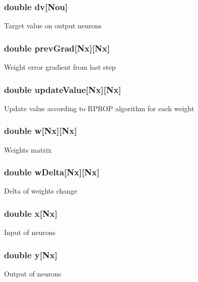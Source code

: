 \subsubsection[{dv}]{\setlength{\rightskip}{0pt plus 5cm}double dv[Nou]}\label{a00001_a3cd26d516c0d78e0bd8e83f7b5d96056}
Target value on output neurons 
\subsubsection[{prev\+Grad}]{\setlength{\rightskip}{0pt plus 5cm}double prev\+Grad[Nx][Nx]}\label{a00001_ae668825bd99ec5a8e701cd34833d92c8}
Weight error gradient from last step 
\subsubsection[{update\+Value}]{\setlength{\rightskip}{0pt plus 5cm}double update\+Value[Nx][Nx]}\label{a00001_a56f1cf095bad5da7e0c944dd9727293a}
Update value according to R\+P\+R\+O\+P algorithm for each weight 
\subsubsection[{w}]{\setlength{\rightskip}{0pt plus 5cm}double w[Nx][Nx]}\label{a00001_aee905c93142ba709a90118c788622185}
Weights matrix 
\subsubsection[{w\+Delta}]{\setlength{\rightskip}{0pt plus 5cm}double w\+Delta[Nx][Nx]}\label{a00001_a19e899724a3a7ab9150e22e0d48ebc3e}
Delta of weights change 
\subsubsection[{x}]{\setlength{\rightskip}{0pt plus 5cm}double x[Nx]}\label{a00001_ac566dbcdd25e058c1e82f59d63dfd12b}
Input of neurons 
\subsubsection[{y}]{\setlength{\rightskip}{0pt plus 5cm}double y[Nx]}\label{a00001_adec9cbbd838a286742a4ae286bff0e30}
Output of neurons 